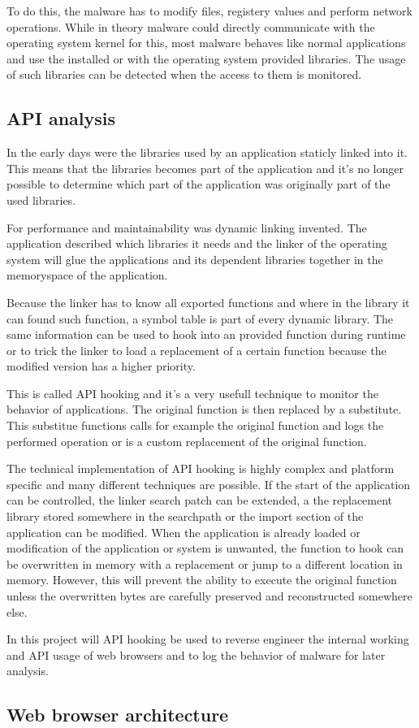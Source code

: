 To do this, the malware has to modify files, registery values and perform network operations. While in theory malware could directly communicate with the operating system kernel for this, most malware behaves like normal applications and use the installed or with the operating system provided libraries. The usage of such libraries can be detected when the access to them is monitored.

\subsection{API analysis}

In the early days were the libraries used by an application staticly linked into it. This means that the libraries becomes part of the application and it's no longer possible to determine which part of the application was originally part of the used libraries.

For performance and maintainability was dynamic linking invented. The application described which libraries it needs and the linker of the operating system will glue the applications and its dependent libraries together in the memoryspace of the application. 

Because the linker has to know all exported functions and where in the library it can found such function, a symbol table is part of every dynamic library. The same information can be used to hook into an provided function during runtime or to trick the linker to load a replacement of a certain function because the modified version has a higher priority.

This is called API hooking\cite{} and it's a very usefull technique to monitor the behavior of applications. The original function is then replaced by a substitute. This substitue functions calls for example the original function and logs the performed operation or is a custom replacement of the original function.

The technical implementation of API hooking is highly complex and platform specific and many different techniques\cite{http://jbremer.org/x86-api-hooking-demystified/} are possible. If the start of the application can be controlled, the linker search patch can be extended, a the replacement library stored somewhere in the searchpath or the import section of the application can be modified. When the application is already loaded or modification of the application or system is unwanted, the function to hook can be overwritten in memory with a replacement or jump to a different location in memory. However, this will prevent the ability to execute the original function unless the overwritten bytes are carefully preserved and reconstructed somewhere else.

In this project will API hooking be used to reverse engineer the internal working and API usage of web browsers and to log the behavior of malware for later analysis.

\subsection{Web browser architecture}

